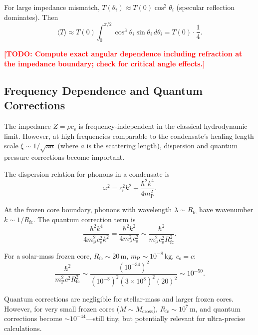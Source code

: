 \documentclass[12pt,a4paper]{article}
\newcommand{\TODO}[1]{\textcolor{red}{\textbf{[TODO: #1]}}}
\newcommand{\planckmass}{m_\text{P}}
\newcommand{\Rfc}{R_\text{fc}}
\newcommand{\Mcross}{M_\text{cross}}
\theoremstyle{definition}
\begin{document}
For large impedance mismatch, $T(\theta_i) \approx T(0) \cos^2\theta_i$ (specular reflection dominates). Then
\begin{equation}
\langle T \rangle \approx T(0) \int_0^{\pi/2} \cos^3\theta_i \sin\theta_i \, d\theta_i = T(0) \cdot \frac{1}{4}.
\label{eq:T_angular_result}
\end{equation}

\TODO{Compute exact angular dependence including refraction at the impedance boundary; check for critical angle effects.}

\subsection{Frequency Dependence and Quantum Corrections}
\label{app:frequency_dependence}

The impedance $Z = \rho c_\text{s}$ is frequency-independent in the classical hydrodynamic limit. However, at high frequencies comparable to the condensate's healing length scale $\xi \sim 1/\sqrt{n a}$ (where $a$ is the scattering length), dispersion and quantum pressure corrections become important.

The dispersion relation for phonons in a condensate is
\begin{equation}
\omega^2 = c_\text{s}^2 k^2 + \frac{\hbar^2 k^4}{4\planckmass^2}.
\label{eq:dispersion_quantum}
\end{equation}

At the frozen core boundary, phonons with wavelength $\lambda \sim \Rfc$ have wavenumber $k \sim 1/\Rfc$. The quantum correction term is
\begin{equation}
\frac{\hbar^2 k^4}{4\planckmass^2 c_\text{s}^2 k^2} = \frac{\hbar^2 k^2}{4\planckmass^2 c_\text{s}^2} \sim \frac{\hbar^2}{\planckmass^2 c_\text{s}^2 \Rfc^2}.
\label{eq:quantum_correction_ratio}
\end{equation}

For a solar-mass frozen core, $\Rfc \sim 20\,\text{m}$, $\planckmass \sim 10^{-8}\,\text{kg}$, $c_\text{s} = c$:
\begin{equation}
\frac{\hbar^2}{\planckmass^2 c^2 \Rfc^2} \sim \frac{(10^{-34})^2}{(10^{-8})^2 (3 \times 10^8)^2 (20)^2} \sim 10^{-50}.
\label{eq:quantum_correction_numerical}
\end{equation}

Quantum corrections are negligible for stellar-mass and larger frozen cores. However, for very small frozen cores ($M \sim \Mcross$), $\Rfc \sim 10^7\,\text{m}$, and quantum corrections become $\sim 10^{-44}$—still tiny, but potentially relevant for ultra-precise calculations.
\end{document}
